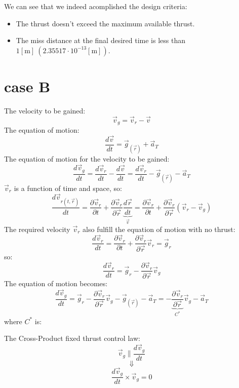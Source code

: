 \documentclass[11pt, a4paper]{article}
\begin{document}
We can see that we indeed acomplished the design criteria:
\begin{itemize}
    \item The thrust doesn't exceed the maximum available thrust.
    \item The miss distance at the final desired time is less than $1[\mathrm{m}]\ \left(2.35517\cdot10^{-13}\left[\mathrm{m}\right]\right)$.
\end{itemize}

\newpage
\section{case B}
The velocity to be gained:
\begin{equation}
    \vec{v}_g=\vec{v}_r-\vec{v}
\end{equation}
The equation of motion:
\begin{equation}
    \frac{d\vec{v}}{dt} = \vec{g}_{\left(\vec{r}\right)}+\vec{a}_T
\end{equation}
The equation of motion for the velocity to be gained:
\begin{equation}
    \frac{d\vec{v}_g}{dt} = \frac{d\vec{v}_r}{dt} - \frac{d\vec{v}}{dt} = \frac{d\vec{v}_r}{dt} - \vec{g}_{\left(\vec{r}\right)} - \vec{a}_T
\end{equation}
$\vec{v}_r$ is a function of time and space, so:
\begin{equation*}
    \frac{d\vec{v}_{r(t,\vec{r})}}{dt} = \frac{\partial\vec{v}_r}{\partial t} + \frac{\partial \vec{v}_r}{\partial\vec{r}}\underbrace{\frac{d\vec{r}}{dt}}_{\vec{v}} = \frac{\partial\vec{v}_r}{\partial t} + \frac{\partial \vec{v}_r}{\partial\vec{r}}\left(\vec{v}_r-\vec{v}_g\right)
\end{equation*}
The required velocity $\vec{v}_r$ also fulfill the equation of motion with no thrust:
\begin{equation*}
    \frac{d\vec{v}_r}{dt} = \frac{\partial\vec{v}_r}{\partial t} + \frac{\partial\vec{v}_r}{\partial \vec{r}}\vec{v}_r = \vec{g}_r
\end{equation*}
so:
\begin{equation}
    \frac{d\vec{v}_r}{dt} = \vec{g}_r - \frac{\partial\vec{v}_r}{\partial\vec{r}}\vec{v}_g
\end{equation}
The equation of motion becomes:
\begin{equation}
    \frac{d\vec{v}_g}{dt} =  \vec{g}_r - \frac{\partial\vec{v}_r}{\partial\vec{r}}\vec{v}_g -\vec{g}_{(\vec{r})} -\vec{a}_T = -\underbrace{\frac{\partial\vec{v}_r}{\partial\vec{r}}}_{C^*}\vec{v}_g-\vec{a}_T
\end{equation}
where $C^*$ is:


\vspace{1cm}
The Cross-Product fixed thrust control law:
\begin{equation}
    \vec{v}_g\parallel\frac{d\vec{v}_g}{dt}
\end{equation}
\begin{equation*}
    \Downarrow
\end{equation*}
\begin{equation*}
    \frac{d\vec{v}_g}{dt}\times\vec{v}_g=0
\end{equation*}
\end{document}
